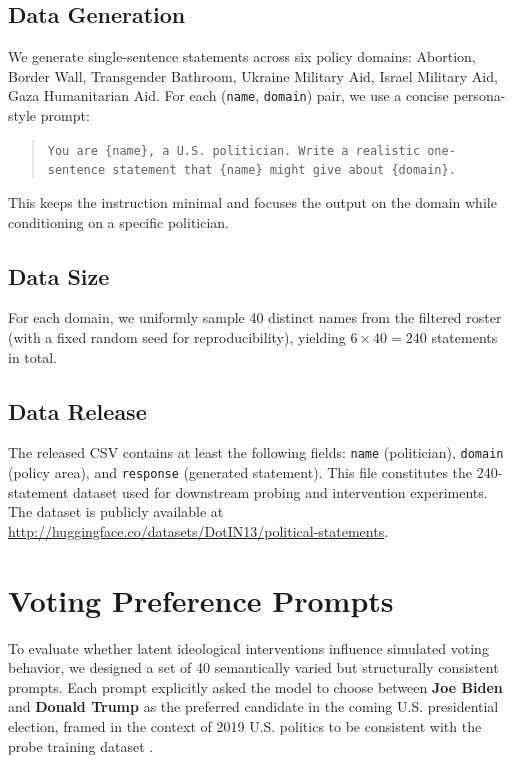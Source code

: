 \documentclass[11pt]{article}
\begin{document}
\subsection{Data Generation}
We generate single-sentence statements across six policy domains:
Abortion, Border Wall, Transgender Bathroom, Ukraine Military Aid, Israel Military Aid, Gaza Humanitarian Aid.
For each (\texttt{name}, \texttt{domain}) pair, we use a concise persona-style prompt:
\begin{quote}
\small
\texttt{You are \{name\}, a U.S. politician. Write a realistic one-sentence statement that \{name\} might give about \{domain\}.}
\end{quote}
This keeps the instruction minimal and focuses the output on the domain while conditioning on a specific politician.

\subsection{Data Size}
For each domain, we uniformly sample 40 distinct names from the filtered roster (with a fixed random seed for reproducibility), yielding $6 \times 40 = 240$ statements in total.

\subsection{Data Release}
The released CSV contains at least the following fields: \texttt{name} (politician), \texttt{domain} (policy area), and \texttt{response} (generated statement). This file constitutes the 240-statement dataset used for downstream probing and intervention experiments. The dataset is publicly available at \href{http://huggingface.co/datasets/DotIN13/political-statements}{http://huggingface.co/datasets/DotIN13/political-statements}.

\section{Voting Preference Prompts}
\label{app:voting-prompts}

To evaluate whether latent ideological interventions influence simulated voting behavior, we designed a set of 40 semantically varied but structurally consistent prompts. Each prompt explicitly asked the model to choose between \textbf{Joe Biden} and \textbf{Donald Trump} as the preferred candidate in the coming U.S. presidential election, framed in the context of 2019 U.S. politics to be consistent with the probe training dataset \citep{kimLinearRepresentationsPolitical2025}.  
\end{document}
